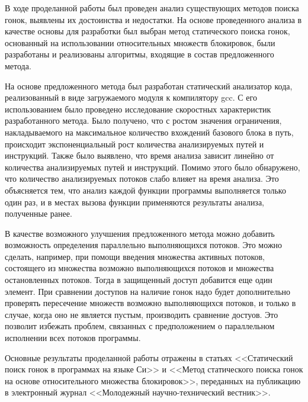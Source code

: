 \Conclusion

В ходе проделанной работы был проведен анализ существующих методов поиска гонок, выявлены их достоинства и недостатки. На основе проведенного анализа в качестве основы для разработки был выбран метод статического поиска гонок, основанный на использовании относительных множеств блокировок, были разработаны и реализованы алгоритмы, входящие в состав предложенного метода.

На основе предложенного метода был разработан статический анализатор кода, реализованный в виде загружаемого модуля к компилятору gcc. С его использованием было проведено исследование скоростных характеристик разработанного метода. Было получено, что с ростом значения ограничения, накладываемого на максимальное количество вхождений базового блока в путь, происходит экспоненциальный рост количества анализируемых путей и инструкций. Также было выявлено, что время анализа  зависит линейно от количества анализируемых путей и инструкций. Помимо этого было обнаружено, что количество анализируемых  потоков слабо влияет на время анализа. Это объясняется тем, что анализ каждой функции программы выполняется только один раз, и в местах вызова функции применяются результаты анализа, полученные ранее.

В качестве возможного улучшения предложенного метода можно добавить возможность определения параллельно выполняющихся потоков. Это можно сделать, например, при помощи введения множества активных потоков, состоящего из множества возможно выполняющихся потоков и множества остановленных потоков. Тогда в защищенный доступ добавится еще один элемент. При сравнении доступов на наличие гонок надо будет дополнительно проверять пересечение множеств возможно выполняющихся потоков, и только в случае, когда оно не является пустым, производить сравнение достуов. Это позволит избежать проблем, связанных с предположением о параллельном исполнении всех потоков программы.

Основные результаты проделанной работы отражены в статьях <<Статический поиск гонок в программах на языке Си>> и <<Метод статического поиска гонок на основе относительного множества блокировок>>, переданных на публикацию в электронный журнал <<Молодежный научно-технический вестник>>.
